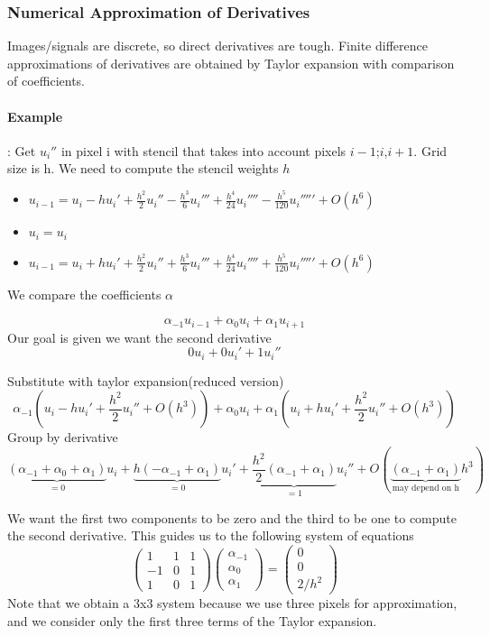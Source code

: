\documentclass{article}
\begin{document}
\subsubsection{Numerical Approximation of Derivatives}
Images/signals are discrete, so direct derivatives are tough. Finite difference approximations of derivatives are obtained by Taylor expansion with comparison of coefficients.

\paragraph{Example}: Get $u_i''$ in pixel i with stencil that takes into account pixels $i-1$;$i$,$i+1$. Grid size is h. We need to compute the stencil weights $h$

\begin{itemize}
  \item $u_{i-1} = u_i - hu_i' + \frac{h^2}{2}u_i'' - \frac{h^3}{6}u_i''' + \frac{h^4}{24}u_i'''' - \frac{h^5}{120}u_i''''' + O(h^6)$   
  \item $u_i = u_i$
  \item $u_{i-1} = u_i + hu_i' + \frac{h^2}{2}u_i'' + \frac{h^3}{6}u_i''' + \frac{h^4}{24}u_i'''' + \frac{h^5}{120}u_i''''' + O(h^6)$
\end{itemize}

We compare the coefficients $\alpha$

\[\alpha_{-1}u_{i-1} + \alpha_0 u_i + \alpha_1u_{i+1}\]
Our goal is given we want the second derivative
\[0u_i + 0u_i' + 1u_i''\]

Substitute with taylor expansion(reduced version)
\[\alpha_{-1}(u_i - hu_i' + \frac{h^2}{2}u_i'' + O(h^3)) + \alpha_0 u_i + \alpha_1(u_i + hu_i' + \frac{h^2}{2}u_i'' + O(h^3))\]
Group by derivative
\[\underbrace{(\alpha_{-1} + \alpha_0 + \alpha_1)}_{=0}u_i + \underbrace{h(-\alpha_{-1}+\alpha_1)}_{=0}u_i' + \underbrace{\frac{h^2}{2}(\alpha_{-1} + \alpha_1)}_{=1}u_i'' + O(\underbrace{(\alpha_{-1}+\alpha_1)}_{\text{may depend on h}}h^3)\]

We want the first two components to be zero and the third to be one to compute the second derivative. This guides us to the following system of equations
\[\begin{pmatrix}
  1 & 1 & 1 \\
  -1 & 0 & 1 \\
  1 & 0 & 1
\end{pmatrix}\begin{pmatrix}
  \alpha_{-1} \\
  \alpha_0 \\
  \alpha_1
\end{pmatrix} = \begin{pmatrix}
  0 \\
  0 \\
  2/h^2
\end{pmatrix}\]
Note that we obtain a 3x3 system because we use three pixels for approximation, and we consider only the first three terms of the Taylor expansion. 
\end{document}

